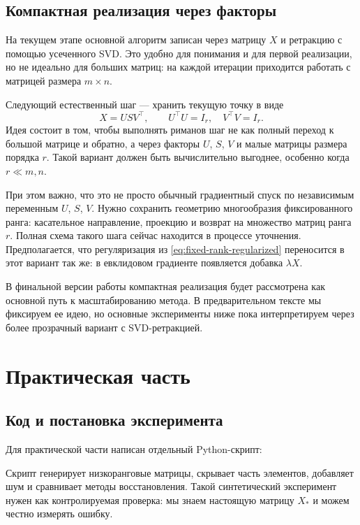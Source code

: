 \documentclass[a4paper,12pt]{article}
\begin{document}
\subsection{Компактная реализация через факторы}

На текущем этапе основной алгоритм записан через матрицу $X$ и ретракцию с помощью усеченного SVD. Это удобно для понимания и для первой реализации, но не идеально для больших матриц: на каждой итерации приходится работать с матрицей размера $m\times n$.

Следующий естественный шаг --- хранить текущую точку в виде
\[
    X=USV^\top,
    \qquad
    U^\top U=I_r,\quad V^\top V=I_r.
\]
Идея состоит в том, чтобы выполнять риманов шаг не как полный переход к большой матрице и обратно, а через факторы $U$, $S$, $V$ и малые матрицы размера порядка $r$. Такой вариант должен быть вычислительно выгоднее, особенно когда $r\ll m,n$.

При этом важно, что это не просто обычный градиентный спуск по независимым переменным $U$, $S$, $V$. Нужно сохранить геометрию многообразия фиксированного ранга: касательное направление, проекцию и возврат на множество матриц ранга $r$. Полная схема такого шага сейчас находится в процессе уточнения. Предполагается, что регуляризация из \eqref{eq:fixed-rank-regularized} переносится в этот вариант так же: в евклидовом градиенте появляется добавка $\lambda X$.

В финальной версии работы компактная реализация будет рассмотрена как основной путь к масштабированию метода. В предварительном тексте мы фиксируем ее идею, но основные эксперименты ниже пока интерпретируем через более прозрачный вариант с SVD-ретракцией.

\newpage

\section{Практическая часть}
\label{sec:empirical}

\subsection{Код и постановка эксперимента}

Для практической части написан отдельный Python-скрипт:
\begin{center}
\end{center}
Скрипт генерирует низкоранговые матрицы, скрывает часть элементов, добавляет шум и сравнивает методы восстановления. Такой синтетический эксперимент нужен как контролируемая проверка: мы знаем настоящую матрицу $X_*$ и можем честно измерять ошибку.
\end{document}
